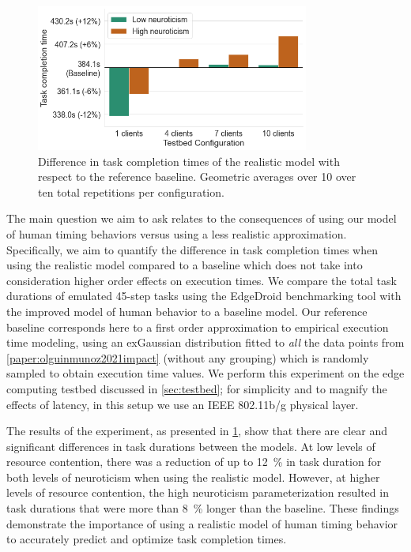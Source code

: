\begin{figure}
    \centering
    \includegraphics[height=13em]{Figs/2023EdgeDroid2/task_durations_diff}
    \caption{Difference in task completion times of the realistic model with respect to the reference baseline.
    Geometric averages over \num{10} over ten total repetitions per configuration.}\label{fig:taskcompletiontimesdiff}
\end{figure}

The main question we aim to ask relates to the consequences of using our model of human timing behaviors versus using a less realistic approximation.
Specifically, we aim to quantify the difference in task completion times when using the realistic model compared to a baseline which does not take into consideration higher order effects on execution times.
We compare the total task durations of emulated \num{45}-step tasks using the EdgeDroid benchmarking tool with the improved model of human behavior to a baseline model.
Our reference baseline corresponds here to a first order approximation to empirical execution time modeling, using an \gls{exGaussian} distribution fitted to \emph{all} the data points from \cref{paper:olguinmunoz2021impact} (without any grouping) which is randomly sampled to obtain execution time values.
We perform this experiment on the edge computing testbed discussed in \cref{sec:testbed};
for simplicity and to magnify the effects of latency, in this setup we use an \acs{IEEE} \num{802.11}b/g physical layer.

The results of the experiment, as presented in \cref{fig:taskcompletiontimesdiff}, show that there are clear and significant differences in task durations between the models.
At low levels of resource contention, there was a reduction of up to \SI{12}{\percent} in task duration for both levels of neuroticism when using the realistic model.
However, at higher levels of resource contention, the high neuroticism parameterization resulted in task durations that were more than \SI{8}{\percent} longer than the baseline.
These findings demonstrate the importance of using a realistic model of human timing behavior to accurately predict and optimize task completion times.

